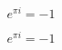 \documentclass{amsart}
\begin{document}
\[ e^{\pi i} = -1 \]

\[ \text{$e^{\pi i} = -1$} \]
\end{document}
